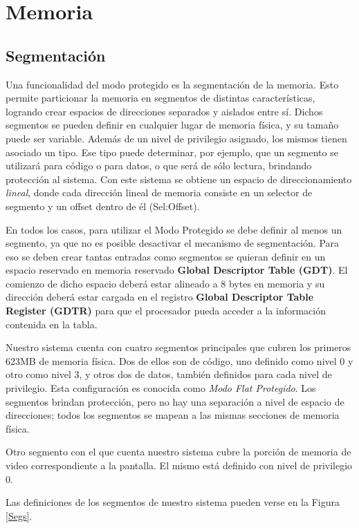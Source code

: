 \documentclass[a4paper]{article}
\begin{document}
\section{Memoria}
\subsection{Segmentación} \label{secSeg}
Una funcionalidad del modo protegido es la segmentación de la memoria. Esto permite particionar la memoria en segmentos de distintas características, logrando crear espacios de direcciones separados y aislados entre sí. Dichos segmentos se pueden definir en cualquier lugar de memoria física, y su tamaño puede ser variable. Además de un nivel de privilegio asignado, los mismos tienen asociado un tipo. Ese tipo puede determinar, por ejemplo, que un segmento se utilizará para código o para datos, o que será de sólo lectura, brindando protección al sistema. Con este sistema se obtiene un espacio de direccionamiento \textit{lineal}, donde cada dirección lineal de memoria consiste en un selector de segmento y un offset dentro de él (Sel:Offset).

En todos los casos, para utilizar el Modo Protegido se debe definir al menos un segmento, ya que no es posible desactivar el mecanismo de segmentación. Para eso se deben crear tantas entradas como segmentos se quieran definir en un espacio reservado en memoria reservado \textbf{Global Descriptor Table (GDT)}. El comienzo de dicho espacio deberá estar alineado a 8 bytes en memoria y su dirección deberá estar cargada en el registro \textbf{Global Descriptor Table Register (GDTR)} para que el procesador pueda acceder a la información contenida en la tabla.

Nuestro sistema cuenta con cuatro segmentos principales que cubren los primeros 623MB de memoria física. Dos de ellos son de código, uno definido como nivel 0 y otro como nivel 3, y otros dos de datos, también definidos para cada nivel de privilegio. Esta configuración es conocida como \textit{Modo Flat Protegido}. Los segmentos brindan protección, pero no hay una separación a nivel de espacio de direcciones; todos los segmentos se mapean a las mismas secciones de memoria física.

Otro segmento con el que cuenta nuestro sistema cubre la porción de memoria de video correspondiente a la pantalla. El mismo está definido con nivel de privilegio 0.

Las definiciones de los segmentos de nuestro sistema pueden verse en la Figura \ref{Segs}.
\end{document}
